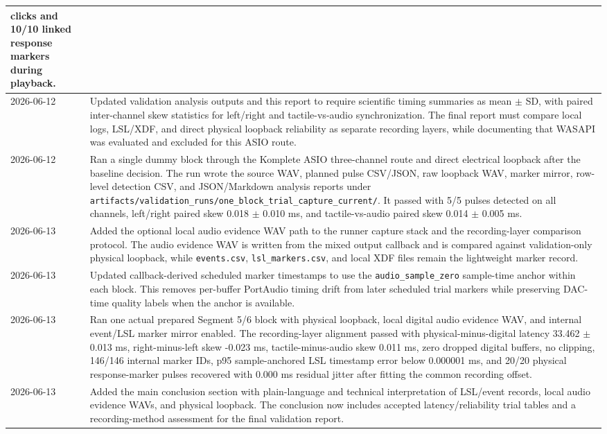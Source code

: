 \documentclass[11pt]{article}
\begin{document}
\begin{longtable}{|p{}|p{}|}
clicks and 10/10 linked response markers during playback. \\
\hline
2026-06-12 & Updated validation analysis outputs and this report to require
scientific timing summaries as mean $\pm$ SD, with paired inter-channel skew
statistics for left/right and tactile-vs-audio synchronization. The final
report must compare local logs, LSL/XDF, and direct physical loopback
reliability as separate recording layers, while documenting that WASAPI was
evaluated and excluded for this ASIO route. \\
\hline
2026-06-12 & Ran a single dummy block through the Komplete ASIO three-channel
route and direct electrical loopback after the baseline decision. The run wrote
the source WAV, planned pulse CSV/JSON, raw loopback WAV, marker mirror,
row-level detection CSV, and JSON/Markdown analysis reports under
\texttt{artifacts/validation\_runs/one\_block\_trial\_capture\_current/}. It
passed with 5/5 pulses detected on all channels, left/right paired skew
0.018 $\pm$ 0.010 ms, and tactile-vs-audio paired skew
0.014 $\pm$ 0.005 ms. \\
\hline
2026-06-13 & Added the optional local audio evidence WAV path to the runner
capture stack and the recording-layer comparison protocol. The audio evidence
WAV is written from the mixed output callback and is compared against
validation-only physical loopback, while \texttt{events.csv},
\texttt{lsl\_markers.csv}, and local XDF files remain the lightweight marker
record. \\
\hline
2026-06-13 & Updated callback-derived scheduled marker timestamps to use the
\texttt{audio\_sample\_zero} sample-time anchor within each block. This removes
per-buffer PortAudio timing drift from later scheduled trial markers while
preserving DAC-time quality labels when the anchor is available. \\
\hline
2026-06-13 & Ran one actual prepared Segment 5/6 block with physical loopback,
local digital audio evidence WAV, and internal event/LSL marker mirror enabled.
The recording-layer alignment passed with physical-minus-digital latency
33.462 $\pm$ 0.013 ms, right-minus-left skew -0.023 ms, tactile-minus-audio
skew 0.011 ms, zero dropped digital buffers, no clipping, 146/146 internal
marker IDs, p95 sample-anchored LSL timestamp error below 0.000001 ms, and
20/20 physical response-marker pulses recovered with 0.000 ms residual jitter
after fitting the common recording offset. \\
\hline
2026-06-13 & Added the main conclusion section with plain-language and technical
interpretation of LSL/event records, local audio evidence WAVs, and physical
loopback. The conclusion now includes accepted latency/reliability trial tables
and a recording-method assessment for the final validation report. \\
\hline
\end{longtable}
\end{document}
